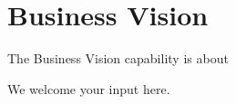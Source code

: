\section{Business Vision}
\label{sec:ekg-mm-a-1-1}
\label{sec:ekg-mm-business-vision}

The Business Vision capability is about


\ekgmmContextSection

We welcome your input here.
